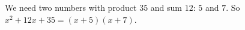 We need two numbers with product $35$ and sum $12$: $5$ and $7$. So $x^2+12x+35=\boxed{(x+5)(x+7)}$.
